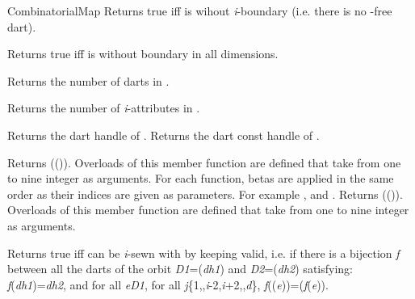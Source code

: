 \begin{ccRefConcept}{CombinatorialMap}
         {Returns true iff  is wihout \emph{i}-boundary
          (i.e. there is no -free dart).
          }

         {Returns true iff  is without boundary in all dimensions.}

    {Returns the number of darts in .}

   {Returns the number of \emph{i}-attributes in . 
     }

    {Returns the dart handle of .}
\ccGlue
{}
    {Returns the dart const handle of .}

{Returns \betaj{}(\betai{}()). 
 Overloads of this member function are defined that take from one to nine integer as arguments.
 For each function, betas are applied in the same order as their indices are given as parameters. 
 For example , and .}
\ccGlue
{}
{Returns \betaj{}(\betai{}()).
  Overloads of this member function are defined that take from one to nine integer as arguments.}

         {Returns true iff  can be \emph{i}-sewn with  by 
           keeping  valid, i.e. if there is
           a bijection \emph{f} between all the darts of the orbit
           \emph{D1}=\orbit{\betaun{},\myldots{},\betaimdeux{},\betaipdeux{},\myldots{},\betad{}}(\emph{dh1}) and
           \emph{D2}=\orbit{\betaun{},\myldots{},\betaimdeux{},\betaipdeux{},\myldots{},\betad{}}(\emph{dh2})
           satisfying: \emph{f}(\emph{dh1})=\emph{dh2}, and for all \emph{e}\myin{}\emph{D1}, for all \emph{j}\myin{}\{1,\myldots{},\emph{i}-2,\emph{i}+2,\myldots{},\emph{d}\},
           \emph{f}(\betaj{}(\emph{e}))=\betajinv{}(\emph{f}(\emph{e})).           
           }	


\end{ccRefConcept}

